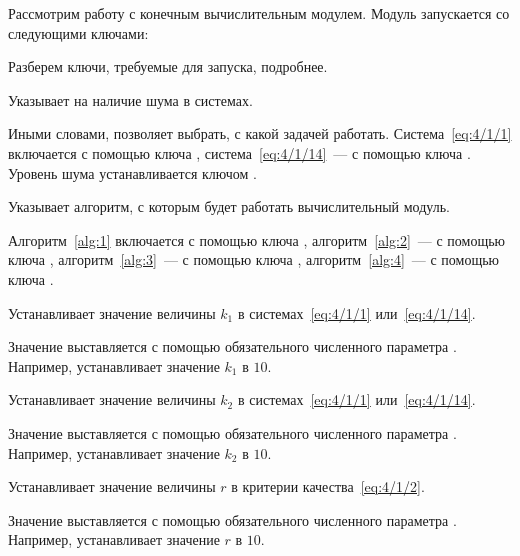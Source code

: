 \newpage

Рассмотрим работу с конечным вычислительным модулем. Модуль запускается со следующими ключами:


Разберем ключи, требуемые для запуска, подробнее.

\bdescr
    \item[\code{--noise|normal}]
        Указывает на наличие шума в системах.

        Иными словами, позволяет выбрать, с какой задачей работать. Система~\ref{eq:4/1/1} включается с помощью ключа , система~\ref{eq:4/1/14}~--- с помощью ключа . Уровень шума устанавливается ключом .

    \item[\code{--classic|static|extended|extendedfalse}]
        Указывает алгоритм, с которым будет работать вычислительный модуль.

        Алгоритм~\vref{alg:1} включается с помощью ключа , алгоритм~\vref{alg:2}~--- с помощью ключа , алгоритм~\vref{alg:3}~--- с помощью ключа , алгоритм~\vref{alg:4}~--- с помощью ключа .

    \item[\code{-k1~num}]
        Устанавливает значение величины $k_1$ в системах~\ref{eq:4/1/1} или~\ref{eq:4/1/14}.

        Значение выставляется с помощью обязательного численного параметра . Например,  устанавливает значение $k_1$ в $10$.

    \item[\code{-k2~num}]
        Устанавливает значение величины $k_2$ в системах~\ref{eq:4/1/1} или~\ref{eq:4/1/14}.

        Значение выставляется с помощью обязательного численного параметра . Например,  устанавливает значение $k_2$ в $10$.

    \item[\code{-r~num}]
        Устанавливает значение величины $r$ в критерии качества~\ref{eq:4/1/2}.

        Значение выставляется с помощью обязательного численного параметра . Например,  устанавливает значение $r$ в $10$.

